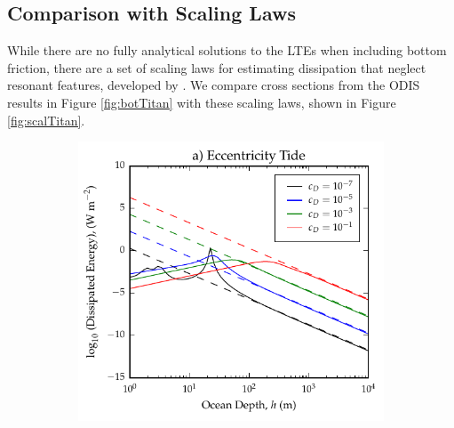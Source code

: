 \subsection{Comparison with Scaling Laws \label{subsec:scalTitan}}

While there are no fully analytical solutions to the LTEs when including bottom friction, there are a set of scaling laws for estimating dissipation that neglect resonant features, developed by \citet{chen2013tidal}. We compare cross sections from the ODIS results in Figure \ref{fig:botTitan} with these scaling laws, shown in Figure \ref{fig:scalTitan}.

\begin{figure}[!t]
\centering
\begin{subfigure}{0.4\linewidth}
\centering
\includegraphics[width=\linewidth]{Figures/Eccentricity_scaling}
\subcaption{\label{fig:scalEccTitan}}
\end{subfigure}%
\begin{subfigure}{0.4\linewidth}
\centering

\end{subfigure}
\end{figure}

